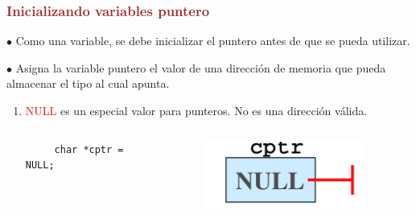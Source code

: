 \documentclass[serif, professionalfont]{beamer}
\newcommand\Fontvi{\fontsize{10}{9.2}\selectfont}
\begin{document}
\begin{frame}[fragile]{}
\frametitle{\textcolor{brown}{\hspace{2.0 cm} Inicializando variables puntero}}
\Fontvi

$\bullet$ Como una variable, se debe inicializar el puntero antes de que se pueda utilizar.

\vspace{0.2cm}

$\bullet$ Asigna la variable puntero el valor de una direcci\'on de memoria que pueda almacenar el tipo al cual apunta.


\begin{enumerate}
\item \textcolor{red}{NULL} es un especial valor para punteros. No es una direcci\'on v\'alida.

\begin{columns}
	\begin{column}{0.2\textwidth}
		\begin{verbatim}
	 char *cptr = NULL;
		\end{verbatim}
	\end{column}
	\begin{column}{0.2\textwidth}
		\begin{figure}[h]
			\centering
			\includegraphics[scale=.3]{j3.png}
		\end{figure}
	\end{column}
	​  \end{columns}


\end{enumerate}
\end{frame}
\end{document}
